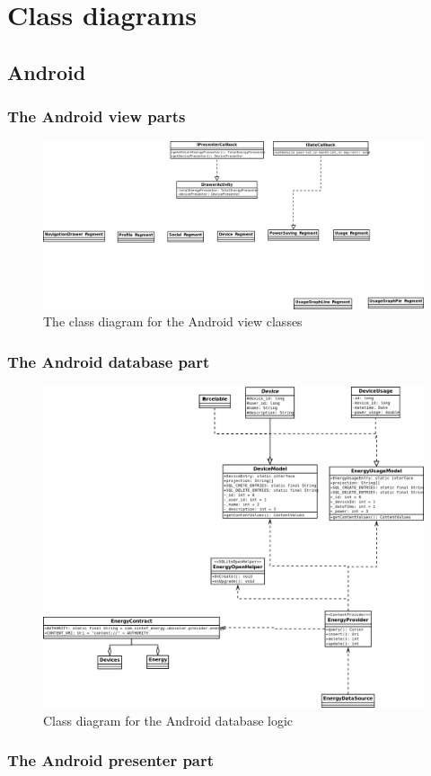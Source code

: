 \section{Class diagrams}

\subsection{Android}
\subsubsection{The Android view parts}
\begin{figure}[H]
\includegraphics[width=\textwidth]{ch/architecture/fig/ClassDiagramAndroid.png}
\caption{The class diagram for the Android view classes}
\end{figure}

\subsubsection{The Android database part}
\begin{figure}[H]
\includegraphics[width=\textwidth]{ch/architecture/fig/classDiagramAndroidDatabase.png}
\caption{Class diagram for the Android database logic}
\end{figure}

\subsubsection{The Android presenter part}




